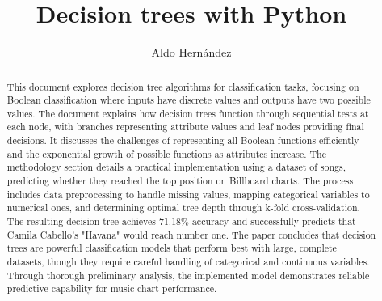 \documentclass[10pt]{article}
\begin{document}
\begin{opening}
  \title{Decision trees with Python}
  \author[Universidad Autónoma de Nuevo León, San Nicolás de los Garza, aldo.hernandezt@uanl.edu.mx]{Aldo Hernández}

  \begin{abstract}
    This document explores decision tree algorithms for classification tasks, focusing on Boolean classification where inputs have discrete values and outputs have two possible values. The document explains how decision trees function through sequential tests at each node, with branches representing attribute values and leaf nodes providing final decisions. It discusses the challenges of representing all Boolean functions efficiently and the exponential growth of possible functions as attributes increase. The methodology section details a practical implementation using a dataset of songs, predicting whether they reached the top position on Billboard charts. The process includes data preprocessing to handle missing values, mapping categorical variables to numerical ones, and determining optimal tree depth through k-fold cross-validation. The resulting decision tree achieves 71.18\% accuracy and successfully predicts that Camila Cabello's "Havana" would reach number one. The paper concludes that decision trees are powerful classification models that perform best with large, complete datasets, though they require careful handling of categorical and continuous variables. Through thorough preliminary analysis, the implemented model demonstrates reliable predictive capability for music chart performance.
  \end{abstract}

\end{opening}
\end{document}
